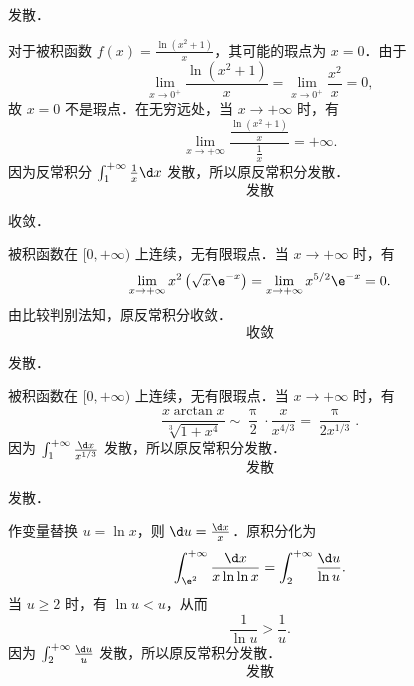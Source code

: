 \begin{solution}
     发散．

    对于被积函数 $f(x) = \frac{\ln(x^2 + 1)}{x}$，其可能的瑕点为 $x = 0$．由于
    \begin{equation}
        \lim_{x \to 0^+} \frac{\ln(x^2 + 1)}{x} = \lim_{x \to 0^+} \frac{x^2}{x} = 0,
    \end{equation}
    故 $x = 0$ 不是瑕点．在无穷远处，当 $x \to +\infty$ 时，有
    \begin{equation}
        \lim_{x \to +\infty} \frac{\frac{\ln(x^2 + 1)}{x}}{\frac{1}{x}} = +\infty.
    \end{equation}
    因为反常积分 $\int_1^{+\infty} \frac{1}{x} \d x$ 发散，所以原反常积分发散．
    \begin{equation}
        \boxed{\text{发散}}
    \end{equation}

     收敛．

    被积函数在 $[0, +\infty)$ 上连续，无有限瑕点．当 $x \to +\infty$ 时，有
    \begin{equation}
        \lim_{x \to +\infty} x^2 \left( \sqrt{x} \e^{-x} \right) = \lim_{x \to +\infty} x^{5/2} \e^{-x} = 0.
    \end{equation}
    由比较判别法知，原反常积分收敛．
    \begin{equation}
        \boxed{\text{收敛}}
    \end{equation}

     发散．

    被积函数在 $[0, +\infty)$ 上连续，无有限瑕点．当 $x \to +\infty$ 时，有
    \begin{equation}
        \frac{x \arctan x}{\sqrt[3]{1 + x^4}} \sim \frac{\uppi}{2} \cdot \frac{x}{x^{4/3}} = \frac{\uppi}{2 x^{1/3}}.
    \end{equation}
    因为 $\int_1^{+\infty} \frac{\d x}{x^{1/3}}$ 发散，所以原反常积分发散．
    \begin{equation}
        \boxed{\text{发散}}
    \end{equation}

     发散．

    作变量替换 $u = \ln x$，则 $\d u = \frac{\d x}{x}$．原积分化为
    \begin{equation}
        \int_{\e^2}^{+\infty} \frac{\d x}{x \ln \ln x} = \int_2^{+\infty} \frac{\d u}{\ln u}.
    \end{equation}
    当 $u \geqslant 2$ 时，有 $\ln u < u$，从而
    \begin{equation}
        \frac{1}{\ln u} > \frac{1}{u}.
    \end{equation}
    因为 $\int_2^{+\infty} \frac{\d u}{u}$ 发散，所以原反常积分发散．
    \begin{equation}
        \boxed{\text{发散}}
    \end{equation}


\end{solution}
